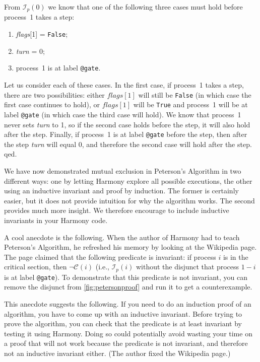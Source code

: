 \documentclass{report}
\begin{document}
From $\mathcal{I}_p(0)$ we know that one of the following three cases must hold before
process~1 takes a step:
\begin{enumerate}
\item \textit{flags}[1] = \texttt{False};
\item \textit{turn} = 0;
\item process~1 is at label \texttt{@gate}.
\end{enumerate}

Let us consider each of these cases.
In the first case, if process~1 takes a step, there are two possibilities:
either $flags[1]$ will still be \texttt{False} (in which case the first case
continues to hold), or $flags[1]$ will be \texttt{True}
and process~1 will be at label \texttt{@gate} (in which case the third case
will hold).
We know that process~1 never sets \textit{turn} to 1, so
if the second case holds before the step, it will also hold after the step.
Finally, if process~1 is at label \texttt{@gate} before the step, then after
the step \textit{turn} will equal 0, and therefore the second case will hold
after the step.  qed.

We have now demonstrated mutual exclusion in Peterson's Algorithm in two
different ways: one by letting Harmony explore all possible executions, the
other using an inductive invariant and proof by induction.  The former
is certainly easier, but it does not provide intuition for why the
algorithm works.  The second provides much more insight.  We therefore
encourage to include inductive invariants in your Harmony code.

A cool anecdote is the following.  When the author of Harmony had to teach
Peterson's Algorithm, he refreshed his memory by looking at the Wikipedia
page.  The page claimed that the following predicate is invariant:
if process $i$ is in the critical section, then $\lnot \mathcal{C}(i)$ (i.e.,
$\mathcal{I}_p(i)$ without the disjunct that process $1-i$ is at label \texttt{@gate}).
To demonstrate that this predicate is not invariant, you can remove the
disjunct from \autoref{fig:petersonproof} and run it to get a
counterexample.

This anecdote suggests the following.  If you need to do an induction
proof of an algorithm, you have to come up with an inductive invariant.
Before trying to prove the algorithm, you can check that the predicate is
at least invariant by testing it using Harmony.  Doing so could potentially
avoid wasting your time on a proof that will not work because the
predicate is not invariant, and therefore not an inductive invariant either.
(The author fixed the Wikipedia page.)
\end{document}
